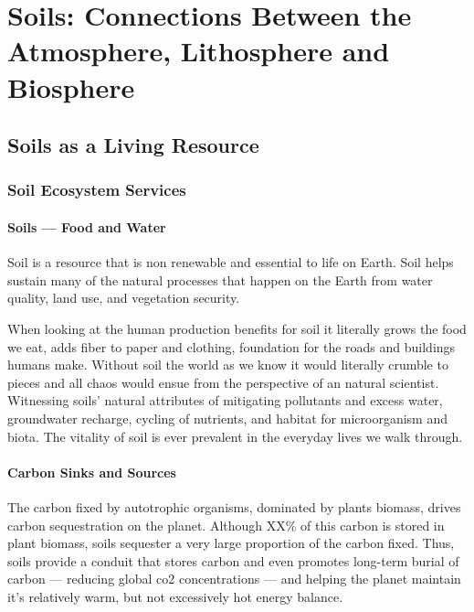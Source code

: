 \chapter{Soils: Connections Between the Atmosphere, Lithosphere and Biosphere}\label{ch:soils}

\section{Soils as a Living Resource}


\subsection{Soil Ecosystem Services}

\subsubsection{Soils --- Food and Water}

Soil is a resource that is non renewable and essential to life on Earth. Soil helps sustain many of the natural processes that happen on the Earth from water quality, land use, and vegetation security. 

When looking at the human production benefits for soil it literally grows the food we eat, adds fiber to paper and clothing, foundation for the roads and buildings humans make. Without soil the world as we know it would literally crumble to pieces and all chaos would ensue from the perspective of an natural scientist. Witnessing soils' natural attributes of mitigating pollutants and excess water, groundwater recharge, cycling of nutrients, and habitat for microorganism and biota. The vitality of soil is ever prevalent in the everyday lives we walk through.


\subsubsection{Carbon Sinks and Sources}

The carbon fixed by autotrophic organisms, dominated by plants biomass, drives carbon sequestration on the planet. Although XX\% of this carbon is stored in plant biomass, soils sequester a very large proportion of the carbon fixed. Thus, soils provide a conduit that stores carbon and even promotes long-term burial of carbon --- reducing global co2 concentrations --- and helping the planet maintain it's relatively warm, but not excessively hot energy balance. 


